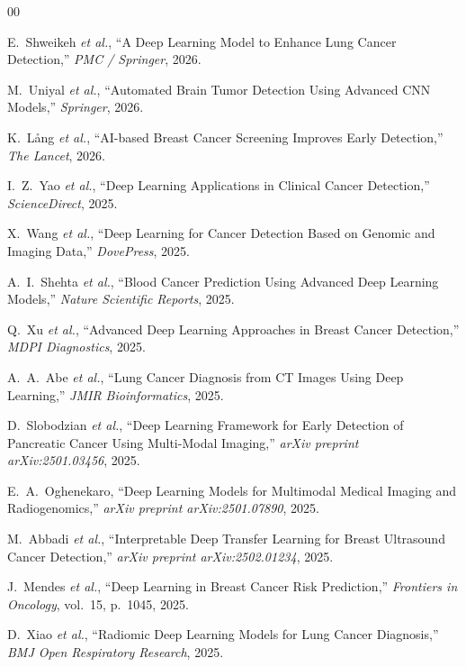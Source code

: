 \documentclass[conference]{IEEEtran}
\begin{document}
\begin{thebibliography}{00}

E.~Shweikeh \textit{et al.}, ``A Deep Learning Model to Enhance Lung Cancer Detection,'' \textit{PMC / Springer}, 2026.

M.~Uniyal \textit{et al.}, ``Automated Brain Tumor Detection Using Advanced CNN Models,'' \textit{Springer}, 2026.

K.~L{\aa}ng \textit{et al.}, ``AI-based Breast Cancer Screening Improves Early Detection,'' \textit{The Lancet}, 2026.

I.~Z.~Yao \textit{et al.}, ``Deep Learning Applications in Clinical Cancer Detection,'' \textit{ScienceDirect}, 2025.

X.~Wang \textit{et al.}, ``Deep Learning for Cancer Detection Based on Genomic and Imaging Data,'' \textit{DovePress}, 2025.

A.~I.~Shehta \textit{et al.}, ``Blood Cancer Prediction Using Advanced Deep Learning Models,'' \textit{Nature Scientific Reports}, 2025.

Q.~Xu \textit{et al.}, ``Advanced Deep Learning Approaches in Breast Cancer Detection,'' \textit{MDPI Diagnostics}, 2025.

A.~A.~Abe \textit{et al.}, ``Lung Cancer Diagnosis from CT Images Using Deep Learning,'' \textit{JMIR Bioinformatics}, 2025.

D.~Slobodzian \textit{et al.}, ``Deep Learning Framework for Early Detection of Pancreatic Cancer Using Multi-Modal Imaging,'' \textit{arXiv preprint arXiv:2501.03456}, 2025.

E.~A.~Oghenekaro, ``Deep Learning Models for Multimodal Medical Imaging and Radiogenomics,'' \textit{arXiv preprint arXiv:2501.07890}, 2025.

M.~Abbadi \textit{et al.}, ``Interpretable Deep Transfer Learning for Breast Ultrasound Cancer Detection,'' \textit{arXiv preprint arXiv:2502.01234}, 2025.

J.~Mendes \textit{et al.}, ``Deep Learning in Breast Cancer Risk Prediction,'' \textit{Frontiers in Oncology}, vol.~15, p.~1045, 2025.

D.~Xiao \textit{et al.}, ``Radiomic Deep Learning Models for Lung Cancer Diagnosis,'' \textit{BMJ Open Respiratory Research}, 2025.


\end{thebibliography}
\end{document}

